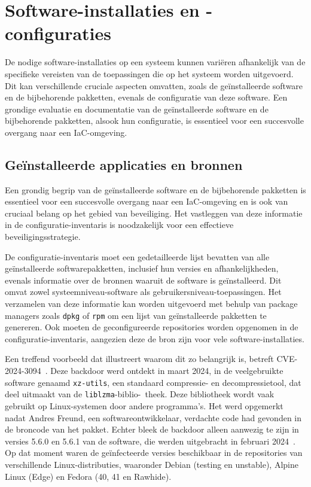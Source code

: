 \section{Software-installaties en -configuraties}
\label{risico_software}

De nodige software-installaties op een systeem kunnen vari\"eren afhankelijk van de specifieke vereisten van de toepassingen die op het systeem worden uitgevoerd.
Dit kan verschillende cruciale aspecten omvatten, zoals de ge\"installeerde software en de bijbehorende pakketten, evenals de configuratie van deze software.
Een grondige evaluatie en documentatie van de ge\"installeerde software en de bijbehorende pakketten, alsook hun configuratie, is essentieel voor een succesvolle overgang naar een IaC-omgeving.

\subsection{Ge{\"i}nstalleerde applicaties en bronnen}
\label{risico_software_installaties_bronnen}

Een grondig begrip van de ge\"installeerde software en de bijbehorende pakketten is essentieel voor een succesvolle overgang naar een IaC-omgeving en is ook van cruciaal belang op het gebied van beveiliging.
Het vastleggen van deze informatie in de configuratie-inventaris is noodzakelijk voor een effectieve beveiligingsstrategie.

De configuratie-inventaris moet een gedetailleerde lijst bevatten van alle ge\"installeerde softwarepakketten, inclusief hun versies en afhankelijkheden, evenals informatie over de bronnen waaruit de software is ge\"installeerd.
Dit omvat zowel systeemniveau-software als gebruikersniveau-toepassingen.
Het verzamelen van deze informatie kan worden uitgevoerd met behulp van package managers zoals \texttt{dpkg} of \texttt{rpm} om een lijst van ge\"installeerde pakketten te genereren.
Ook moeten de geconfigureerde repositories worden opgenomen in de configuratie-inventaris, aangezien deze de bron zijn voor vele software-installaties.

Een treffend voorbeeld dat illustreert waarom dit zo belangrijk is, betreft CVE-2024-3094~\autocite{nist-CVE-2024-3094}.
Deze backdoor werd ontdekt in maart 2024, in de veelgebruikte software genaamd \texttt{xz-utils}, een standaard compressie- en decompressietool, dat deel uitmaakt van de \texttt{liblzma}-biblio-\ theek.
Deze bibliotheek wordt vaak gebruikt op Linux-systemen door andere programma's.
Het werd opgemerkt nadat Andres Freund, een softwareontwikkelaar, verdachte code had gevonden in de broncode van het pakket.
Echter bleek de backdoor alleen aanwezig te zijn in versies 5.6.0 en 5.6.1 van de software, die werden uitgebracht in februari 2024~\autocite{lins2024critical}.
Op dat moment waren de ge\"infecteerde versies beschikbaar in de repositories van verschillende Linux-distributies, waaronder Debian (testing en unstable), Alpine Linux (Edge) en Fedora (40, 41 en Rawhide).

